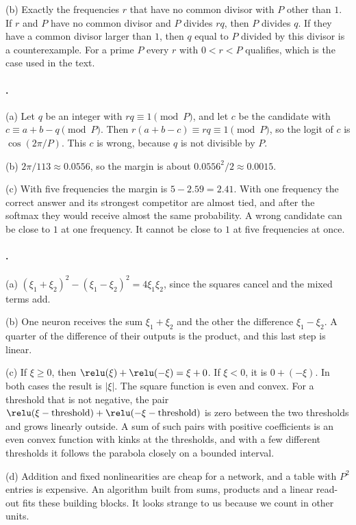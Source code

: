 {(b) Exactly the frequencies $r$ that have no common divisor with $P$ other than $1$. If $r$ and $P$ have no common
divisor and $P$ divides $rq$, then $P$ divides $q$. If they have a common divisor larger than $1$, then $q$ equal to
$P$ divided by this divisor is a counterexample. For a prime $P$ every $r$ with $0<r<P$ qualifies, which is the
case used in the text.

\paragraph{.}
(a) Let $q$ be an integer with $rq\equiv1\pmod P$, and let $c$ be the candidate with $c\equiv a+b-q\pmod P$. Then
$r(a+b-c)\equiv rq\equiv1\pmod P$, so the logit of $c$ is $\cos(2\pi/P)$. This $c$ is wrong, because $q$ is not
divisible by $P$.

(b) $2\pi/113\approx0.0556$, so the margin is about $0.0556^2/2\approx0.0015$.

(c) With five frequencies the margin is $5-2.59=2.41$. With one frequency the correct answer and its strongest
competitor are almost tied, and after the softmax they would receive almost the same probability. A wrong
candidate can be close to $1$ at one frequency. It cannot be close to $1$ at five frequencies at once.

\paragraph{.}
(a) $(\xi_1+\xi_2)^2-(\xi_1-\xi_2)^2=4\xi_1\xi_2$, since the squares cancel and the mixed terms add.

(b) One neuron receives the sum $\xi_1+\xi_2$ and the other the difference $\xi_1-\xi_2$. A quarter of the
difference of their outputs is the product, and this last step is linear.

(c) If $\xi\ge0$, then $\relu(\xi)+\relu(-\xi)=\xi+0$. If $\xi<0$, it is $0+(-\xi)$. In both cases the result is
$|\xi|$. The square function is even and convex. For a threshold that is not negative, the pair
$\relu(\xi-\text{threshold})+\relu(-\xi-\text{threshold})$ is zero between the two thresholds and grows linearly
outside. A sum of such pairs with positive coefficients is an even convex function with kinks at the thresholds,
and with a few different thresholds it follows the parabola closely on a bounded interval.

(d) Addition and fixed nonlinearities are cheap for a network, and a table with $P^2$ entries is expensive. An
algorithm built from sums, products and a linear read-out fits these building blocks. It looks strange to us
because we count in other units.

}
